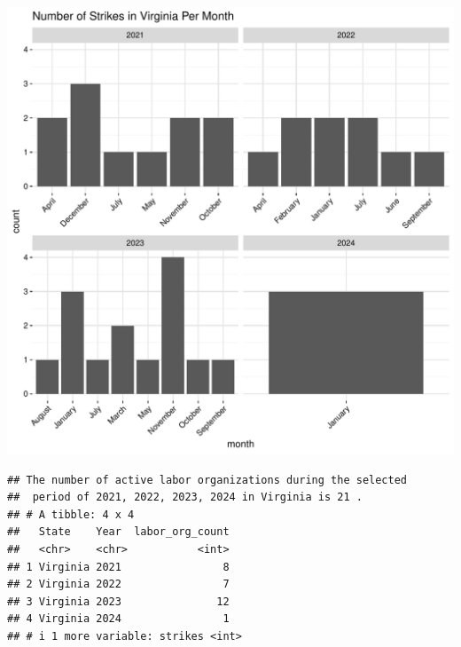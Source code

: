 \documentclass[11pt]{article}\usepackage[]{graphicx}\usepackage[]{xcolor}
\makeatletter
\newenvironment{kframe}{%
 \def\at@end@of@kframe{}%
 \ifinner\ifhmode%
  \def\at@end@of@kframe{\end{minipage}}%
  \begin{minipage}{\columnwidth}%
 \fi\fi%
 \def\FrameCommand##1{\hskip\@totalleftmargin \hskip-\fboxsep
 \colorbox{shadecolor}{##1}\hskip-\fboxsep
     \hskip-\linewidth \hskip-\@totalleftmargin \hskip\columnwidth}%
 \MakeFramed {\advance\hsize-\width
   \@totalleftmargin\z@ \linewidth\hsize
   \@setminipage}}%
 {\par\unskip\endMakeFramed%
 \at@end@of@kframe}
\newenvironment{knitrout}{}{} %
\makeatother
\begin{document}
\begin{knitrout}
\color{fgcolor}

{\centering \includegraphics[width=0.7\linewidth]{figure/calling_the_ggplots_Virginia-1} 

}


\begin{kframe}\begin{verbatim}
## The number of active labor organizations during the selected 
##  period of 2021, 2022, 2023, 2024 in Virginia is 21 .
## # A tibble: 4 x 4
##   State    Year  labor_org_count
##   <chr>    <chr>           <int>
## 1 Virginia 2021                8
## 2 Virginia 2022                7
## 3 Virginia 2023               12
## 4 Virginia 2024                1
## # i 1 more variable: strikes <int>
\end{verbatim}
\end{kframe}
\end{knitrout}
\end{document}
